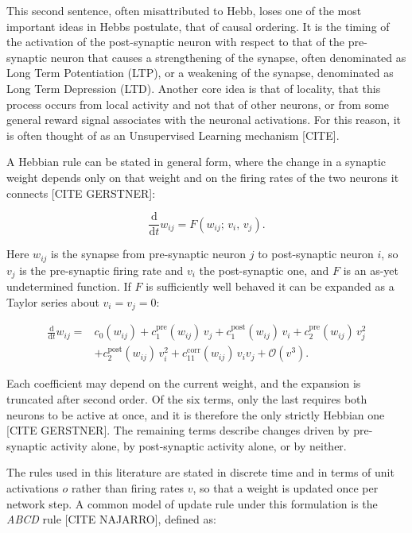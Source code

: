 \documentclass{article} %
\begin{document}
This second sentence, often misattributed to Hebb, loses one of the most important ideas in Hebbs postulate, that of causal ordering. It is the timing of the activation of the post-synaptic neuron with respect to that of the pre-synaptic neuron that causes a strengthening of the synapse, often denominated as Long Term Potentiation (LTP), or a weakening of the synapse, denominated as Long Term Depression (LTD). Another core idea is that of locality, that this process occurs from local activity and not that of other neurons, or from some general reward signal associates with the neuronal activations. For this reason, it is often thought of as an Unsupervised Learning mechanism [CITE].   

A Hebbian rule can be stated in general form, where the change in a synaptic
weight depends only on that weight and on the firing rates of the two neurons
it connects [CITE GERSTNER]:

\begin{equation}
    \frac{\mathrm{d}}{\mathrm{d}t} w_{ij} = F\!\left(w_{ij};\, v_i,\, v_j\right).
    \label{eq:plasticity-general}
\end{equation}

Here $w_{ij}$ is the synapse from pre-synaptic neuron $j$ to post-synaptic
neuron $i$, so $v_j$ is the pre-synaptic firing rate and $v_i$ the
post-synaptic one, and $F$ is an as-yet undetermined function. If $F$ is
sufficiently well behaved it can be expanded as a Taylor series about
$v_i = v_j = 0$:

\begin{equation}
\begin{split}
    \frac{\mathrm{d}}{\mathrm{d}t} w_{ij} = {} & c_0(w_{ij}) + c_1^{\mathrm{pre}}(w_{ij})\, v_j + c_1^{\mathrm{post}}(w_{ij})\, v_i + c_2^{\mathrm{pre}}(w_{ij})\, v_j^{2} \\
    & + c_2^{\mathrm{post}}(w_{ij})\, v_i^{2} + c_{11}^{\mathrm{corr}}(w_{ij})\, v_i v_j + \mathcal{O}(v^3).
\end{split}
\label{eq:plasticity-taylor}
\end{equation}

Each coefficient may depend on the current weight, and the expansion is
truncated after second order. Of the six terms, only the last requires both
neurons to be active at once, and it is therefore the only strictly Hebbian
one [CITE GERSTNER]. The remaining terms describe changes driven by pre-synaptic activity
alone, by post-synaptic activity alone, or by neither.

The rules used in this literature are stated in discrete time and in terms of
unit activations $o$ rather than firing rates $v$, so that a weight is updated
once per network step. A common model of update rule under this formulation is
the \textit{ABCD} rule [CITE NAJARRO], defined as:
\end{document}
